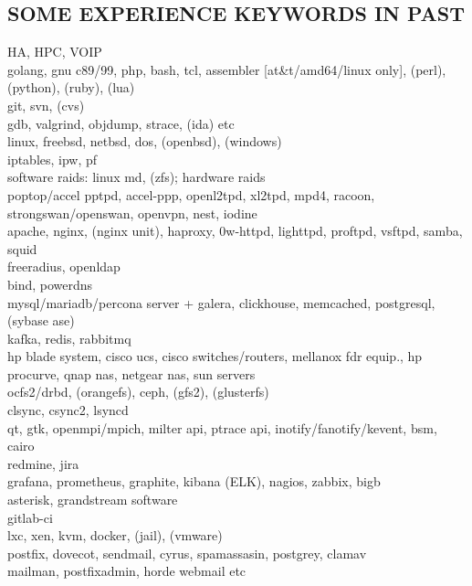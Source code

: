 \begin{resume}
\section{SOME EXPERIENCE KEYWORDS IN PAST}
\vspace{0.1in} 
    HA, HPC, VOIP\\
    golang, gnu c89/99, php, bash, tcl, assembler [at\&t/amd64/linux only], (perl), (python), (ruby), (lua)\\
    git, svn, (cvs)\\
    gdb, valgrind, objdump, strace, (ida) etc\\
    linux, freebsd, netbsd, dos, (openbsd), (windows)\\
    iptables, ipw, pf\\
    software raids: linux md, (zfs); hardware raids\\
    poptop/accel pptpd, accel-ppp, openl2tpd, xl2tpd, mpd4, racoon, strongswan/openswan, openvpn, nest, iodine\\
    apache, nginx, (nginx unit), haproxy, 0w-httpd, lighttpd, proftpd, vsftpd, samba, squid\\
    freeradius, openldap\\
    bind, powerdns\\
    mysql/mariadb/percona server + galera, clickhouse, memcached, postgresql, (sybase ase)\\
    kafka, redis, rabbitmq\\
    hp blade system, cisco ucs, cisco switches/routers, mellanox fdr equip., hp procurve, qnap nas, netgear nas, sun servers\\
    ocfs2/drbd, (orangefs), ceph, (gfs2), (glusterfs)\\
    clsync, csync2, lsyncd\\
    qt, gtk, openmpi/mpich, milter api, ptrace api, inotify/fanotify/kevent, bsm, cairo\\
    redmine, jira\\
    grafana, prometheus, graphite, kibana (ELK), nagios, zabbix, bigb\\
    asterisk, grandstream software\\
    gitlab-ci\\
    lxc, xen, kvm, docker, (jail), (vmware)\\
    postfix, dovecot, sendmail, cyrus, spamassasin, postgrey, clamav\\
    mailman, postfixadmin, horde webmail etc\\

\end{resume}

